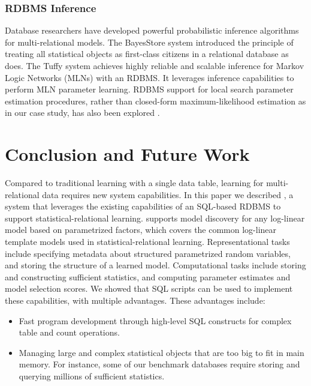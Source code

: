 \subsubsection{RDBMS Inference} 
Database researchers have developed powerful probabilistic inference  algorithms for multi-relational models. 
 The BayesStore system \cite{Wang2008} introduced the principle of treating all statistical objects as first-class citizens in a relational database as \FB  does. The Tuffy system \cite{Niu2011} achieves highly reliable and scalable inference for Markov Logic Networks (MLNs) with an RDBMS. It leverages inference capabilities to perform MLN parameter learning. RDBMS support for local search parameter estimation procedures, rather than closed-form maximum-likelihood estimation as in our case study, has also been explored \cite{Feng_SIGMOD_2012,Niu2011,Niu2011a}.


\section{Conclusion and Future Work} 
Compared to traditional learning with a single data table, learning for multi-relational data requires new system capabilities. In this paper we described \FB, a system that leverages the existing capabilities of an SQL-based RDBMS to support statistical-relational learning. \FB supports model discovery for any log-linear model based on parametrized factors, which covers the common log-linear template models used in statistical-relational learning. 
Representational tasks include specifying metadata about structured parametrized random variables, and storing the structure of a learned model. Computational tasks include storing and constructing sufficient statistics, and computing parameter estimates and model selection scores. 
We showed that SQL scripts can be used to implement these capabilities, with multiple advantages. These advantages include: 
\begin{itemize}
\item Fast program development through high-level SQL constructs for complex table and count operations.
\item Managing large and complex statistical objects that are too big to fit in main memory. 
For instance, some of our benchmark databases require storing and querying millions of sufficient statistics. 
\end{itemize}


